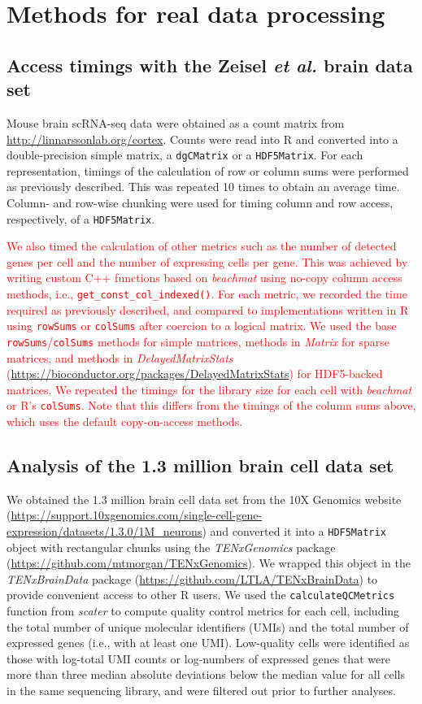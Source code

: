 \documentclass{article}
\newcommand{\beachmat}{\textit{beachmat}}
\newcommand{\code}[1]{\texttt{#1}}
\newcommand{\revised}[1]{\textcolor{red}{#1}}
\begin{document}
\section{Methods for real data processing}

\subsection{Access timings with the Zeisel \textit{et al.} brain data set}
Mouse brain scRNA-seq data \cite{zeisel2015brain} were obtained as a count matrix from \url{http://linnarssonlab.org/cortex}.
Counts were read into R and converted into a double-precision simple matrix, a \code{dgCMatrix} or a \code{HDF5Matrix}.
For each representation, timings of the calculation of row or column sums were performed as previously described.
This was repeated 10 times to obtain an average time.
Column- and row-wise chunking were used for timing column and row access, respectively, of a \code{HDF5Matrix}.

\revised{We also timed the calculation of other metrics such as the number of detected genes per cell and the number of expressing cells per gene.
This was achieved by writing custom C++ functions based on \beachmat{} using no-copy column access methods, i.e., \code{get\_const\_col\_indexed()}.
For each metric, we recorded the time required as previously described, and compared to implementations written in R using \code{rowSums} or \code{colSums} after coercion to a logical matrix.
We used the base \code{rowSums}/\code{colSums} methods for simple matrices, methods in \textit{Matrix} for sparse matrices, and methods in \textit{DelayedMatrixStats} (\url{https://bioconductor.org/packages/DelayedMatrixStats}) for HDF5-backed matrices.
We repeated the timings for the library size for each cell with \beachmat{} or R's \code{colSums}.
Note that this differs from the timings of the column sums above, which uses the default copy-on-access methods.}

\subsection{Analysis of the 1.3 million brain cell data set}
We obtained the 1.3 million brain cell data set from the 10X Genomics website (\url{https://support.10xgenomics.com/single-cell-gene-expression/datasets/1.3.0/1M_neurons})
and converted it into a \code{HDF5Matrix} object with rectangular chunks using the \textit{TENxGenomics} package (\url{https://github.com/mtmorgan/TENxGenomics}).
We wrapped this object in the \textit{TENxBrainData} package (\url{https://github.com/LTLA/TENxBrainData}) to provide convenient access to other R users.
We used the \code{calculateQCMetrics} function from \textit{scater} \cite{mccarthy2017scater} to compute quality control metrics for each cell,
including the total number of unique molecular identifiers (UMIs) and the total number of expressed genes (i.e., with at least one UMI).
Low-quality cells were identified as those with log-total UMI counts or log-numbers of expressed genes that were more than three median absolute deviations below the median value for all cells in the same sequencing library, and were filtered out prior to further analyses.
\end{document}
